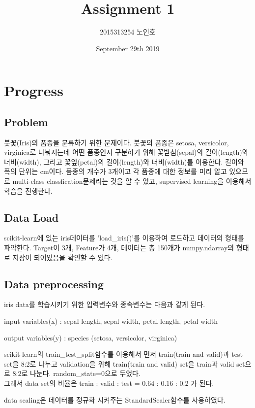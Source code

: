 \documentclass[a4paper, 11pt]{article}
\title{Assignment 1}
\author{2015313254 노인호}
\date{September 29th 2019}
\begin{document}
\maketitle
{}
\setlength{\parskip}{0.05em}

\section{Progress}
\subsection{Problem}
붓꽃(Iris)의 품종을 분류하기 위한 문제이다. 붓꽃의 품종은 setosa, versicolor, virginica로 나눠지는데 어떤 품종인지 구분하기 위해 꽃받침(sepal)의 길이(length)와 너비(width), 그리고 꽃잎(petal)의 길이(length)와 너비(width)를 이용한다. 길이와 폭의 단위는 cm이다. 품종의 개수가 3개이고 각 품종에 대한 정보를 미리 알고 있으므로 multi-class classfication문제라는 것을 알 수 있고, supervised learning을 이용해서 학습을 진행한다.

\subsection{Data Load}

scikit-learn에 있는 iris데이터를 'load\_iris()'를 이용하여 로드하고 데이터의 형태를 파악한다. Target이 3개, Feature가 4개, 데이터는 총 150개가 numpy.ndarray의 형태로 저장이 되어있음을 확인할 수 있다.

\subsection{Data preprocessing}
\benum
\item iris data를 학습시키기 위한 입력변수와 종속변수는 다음과 같게 된다.
\bitem
	\item input variables(x) :  sepal length, sepal width, petal length, petal width
	\item output variables(y) : species (setosa, versicolor, virginica)
\eitem
\item scikit-learn의 train\_test\_split함수를 이용해서 먼저 train(train and valid)과 test set을 8:2로 나누고 validation을 위해 train(train and valid) set을 train과 valid set으로 8:2로 나눈다. random\_state=0으로 두었다.
\\
그래서 data set의 비율은 train : valid : test = 0.64 : 0.16 : 0.2 가 된다.

\item data scaling은 데이터를 정규화 시켜주는 StandardScaler함수를 사용하였다.
\eenum
\end{document}

